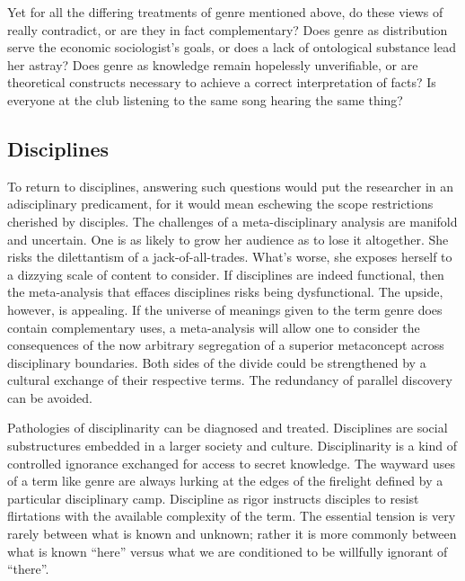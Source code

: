\documentclass[]{book}
\theoremstyle{definition}
\theoremstyle{definition}
\theoremstyle{definition}
\theoremstyle{remark}
\begin{document}
Yet for all the differing treatments of genre mentioned above, do these
views of really contradict, or are they in fact complementary? Does
genre as distribution serve the economic sociologist's goals, or does a
lack of ontological substance lead her astray? Does genre as knowledge
remain hopelessly unverifiable, or are theoretical constructs necessary
to achieve a correct interpretation of facts? Is everyone at the club
listening to the same song hearing the same thing?

\hypertarget{disciplines}{%
\subsection{Disciplines}\label{disciplines}}

To return to disciplines, answering such questions would put the
researcher in an adisciplinary predicament, for it would mean eschewing
the scope restrictions cherished by disciples. The challenges of a
meta-disciplinary analysis are manifold and uncertain. One is as likely
to grow her audience as to lose it altogether. She risks the
dilettantism of a jack-of-all-trades. What's worse, she exposes herself
to a dizzying scale of content to consider. If disciplines are indeed
functional, then the meta-analysis that effaces disciplines risks being
dysfunctional. The upside, however, is appealing. If the universe of
meanings given to the term genre does contain complementary uses, a
meta-analysis will allow one to consider the consequences of the now
arbitrary segregation of a superior metaconcept across disciplinary
boundaries. Both sides of the divide could be strengthened by a cultural
exchange of their respective terms. The redundancy of parallel discovery
can be avoided.

Pathologies of disciplinarity can be diagnosed and treated. Disciplines
are social substructures embedded in a larger society and culture.
Disciplinarity is a kind of controlled ignorance exchanged for access to
secret knowledge. The wayward uses of a term like genre are always
lurking at the edges of the firelight defined by a particular
disciplinary camp. Discipline as rigor instructs disciples to resist
flirtations with the available complexity of the term. The essential
tension is very rarely between what is known and unknown; rather it is
more commonly between what is known ``here'' versus what we are
conditioned to be willfully ignorant of ``there''.
\end{document}
